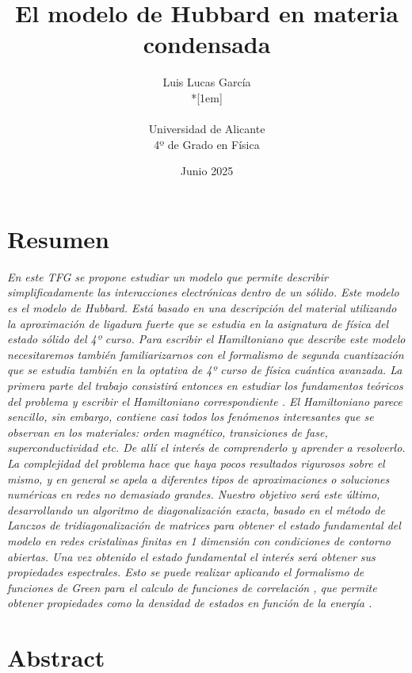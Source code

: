 \documentclass[12pt,twoside]{article}
\title{El modelo de Hubbard en materia condensada}
\author{Luis Lucas García\\*[1em]
\begin{minipage}{0.75\textwidth}
\footnotesize \itshape
\begin{center}
Universidad de Alicante \\
4º de Grado en Física
\end{center}
\end{minipage}
}
\date{Junio 2025}
\begin{document}




\section*{Resumen}

\emph{En este TFG se propone estudiar un modelo que permite describir simplificadamente las interacciones electrónicas dentro de un sólido. Este modelo es el modelo de Hubbard. Está basado en una descripción del material utilizando la aproximación de ligadura fuerte que se estudia en la asignatura de física del estado sólido del 4º curso. Para escribir el Hamiltoniano que describe este modelo necesitaremos también familiarizarnos con el formalismo de segunda cuantización que se estudia también en la optativa de 4º curso de física cuántica avanzada. La primera parte del trabajo consistirá entonces en estudiar los fundamentos teóricos del problema y escribir el Hamiltoniano correspondiente \cite{alma9947259002101}. El Hamiltoniano parece sencillo, sin embargo, contiene casi todos los fenómenos interesantes que se observan en los materiales: orden magnético, transiciones de fase, superconductividad etc. De allí el interés de comprenderlo y aprender a resolverlo. La complejidad del problema hace que haya pocos resultados rigurosos sobre el mismo, y en general se apela a diferentes tipos de aproximaciones o soluciones numéricas en redes no demasiado grandes. Nuestro objetivo será este último, desarrollando un algoritmo de diagonalización exacta, basado en el método de Lanczos de tridiagonalización de matrices para obtener el estado fundamental del modelo en redes cristalinas finitas en 1 dimensión con condiciones de contorno abiertas. Una vez obtenido el estado fundamental el interés será obtener sus propiedades espectrales. Esto se puede realizar aplicando el formalismo de funciones de Green para el calculo de funciones de correlación \cite{fetter2003quantum}, que permite obtener propiedades como la densidad de estados en función de la energía \cite{RevModPhys.66.763}.}

\newpage

\section*{Abstract}
\end{document}
